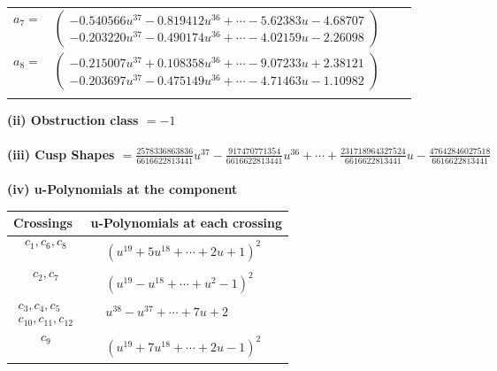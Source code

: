 \documentclass[1p]{elsarticle_modified}
\theoremstyle{definition}
\begin{document}
\begin{tabular}{m{7pt} m{180pt} m{7pt} m{180pt} }
\flushright $a_{7}=$&$\begin{pmatrix}-0.540566 u^{37}-0.819412 u^{36}+\cdots-5.62383 u-4.68707\\-0.203220 u^{37}-0.490174 u^{36}+\cdots-4.02159 u-2.26098\end{pmatrix}$ \\
\flushright $a_{8}=$&$\begin{pmatrix}-0.215007 u^{37}+0.108358 u^{36}+\cdots-9.07233 u+2.38121\\-0.203697 u^{37}-0.475149 u^{36}+\cdots-4.71463 u-1.10982\end{pmatrix}$\\&\end{tabular}
\flushleft \textbf{(ii) Obstruction class $= -1$}\\~\\
\flushleft \textbf{(iii) Cusp Shapes $= \frac{2578336863836}{6616622813441} u^{37}-\frac{917470771354}{6616622813441} u^{36}+\cdots+\frac{231718964327524}{6616622813441} u-\frac{47642846027518}{6616622813441}$}\\~\\
\newpage\renewcommand{\arraystretch}{1}
\flushleft \textbf{(iv) u-Polynomials at the component}\newline \\
\begin{tabular}{m{50pt}|m{274pt}}
Crossings & \hspace{64pt}u-Polynomials at each crossing \\
\hline $$\begin{aligned}c_{1},c_{6},c_{8}\end{aligned}$$&$\begin{aligned}
&(u^{19}+5 u^{18}+\cdots+2 u+1)^{2}
\end{aligned}$\\
\hline $$\begin{aligned}c_{2},c_{7}\end{aligned}$$&$\begin{aligned}
&(u^{19}- u^{18}+\cdots+u^2-1)^{2}
\end{aligned}$\\
\hline $$\begin{aligned}c_{3},c_{4},c_{5}\\c_{10},c_{11},c_{12}\end{aligned}$$&$\begin{aligned}
&u^{38}- u^{37}+\cdots+7 u+2
\end{aligned}$\\
\hline $$\begin{aligned}c_{9}\end{aligned}$$&$\begin{aligned}
&(u^{19}+7 u^{18}+\cdots+2 u-1)^{2}
\end{aligned}$\\
\hline
\end{tabular}\\~\\
\end{document}
